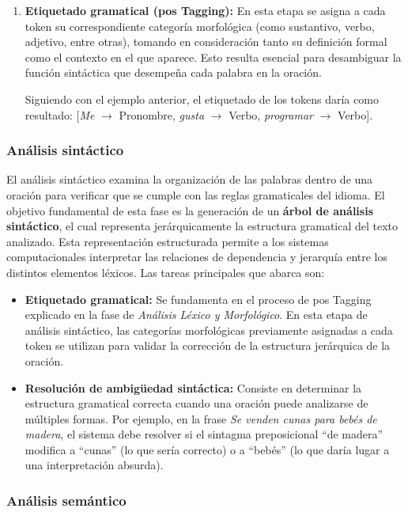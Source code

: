 \begin{enumerate}
    \item \textbf{Etiquetado gramatical (\gls{pos} Tagging):} En esta etapa se asigna a cada token su correspondiente categoría morfológica (como sustantivo, verbo, adjetivo, entre otras), tomando en consideración tanto su definición formal como el contexto en el que aparece. Esto resulta esencial para desambiguar la función sintáctica que desempeña cada palabra en la oración.

          Siguiendo con el ejemplo anterior, el etiquetado de los tokens daría como resultado: [\textit{Me} $\rightarrow$ Pronombre, \textit{gusta} $\rightarrow$ Verbo, \textit{programar} $\rightarrow$ Verbo].
\end{enumerate}

\subsubsection{Análisis sintáctico}

El análisis sintáctico examina la organización de las palabras dentro de una oración para verificar que se cumple con las reglas gramaticales del idioma. El objetivo fundamental de esta fase es la generación de un \textbf{árbol de análisis sintáctico}, el cual representa jerárquicamente la estructura gramatical del texto analizado. Esta representación estructurada permite a los sistemas computacionales interpretar las relaciones de dependencia y jerarquía entre los distintos elementos léxicos. Las tareas principales que abarca son:

\begin{itemize}
    \item \textbf{Etiquetado gramatical:} Se fundamenta en el proceso de \gls{pos} Tagging explicado en la fase de \textit{Análisis Léxico y Morfológico}. En esta etapa de análisis sintáctico, las categorías morfológicas previamente asignadas a cada token se utilizan para validar la corrección de la estructura jerárquica de la oración.
    \item \textbf{Resolución de ambigüedad sintáctica:} Consiste en determinar la estructura gramatical correcta cuando una oración puede analizarse de múltiples formas. Por ejemplo, en la frase \textit{Se venden cunas para bebés de madera}, el sistema debe resolver si el sintagma preposicional ``de madera'' modifica a ``cunas'' (lo que sería correcto) o a ``bebés'' (lo que daría lugar a una interpretación absurda).
\end{itemize}

\subsubsection{Análisis semántico}

